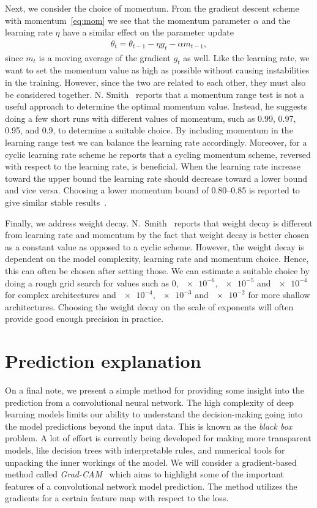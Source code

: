 Next, we consider the choice of momentum. From the gradient descent scheme with
momentum~\cref{eq:mom} we see that the momentum parameter $\alpha$ and the
learning rate $\eta$ have a similar effect on the parameter update
\begin{align*}
  \theta_t = \theta_{t-1} - \eta g_t - \alpha m_{t-1},
\end{align*}
since $m_t$ is a moving average of the gradient $g_t$ as well. Like the learning
rate, we want to set the momentum value as high as possible without causing
instabilities in the training. However, since the two are related to each other,
they must also be considered together. N. Smith~\cite{smith2018disciplined} reports that a momentum range test is not a useful approach to determine the
optimal momentum value. Instead, he suggests doing a few short runs with different values of momentum,
such as 0.99, 0.97, 0.95, and 0.9, to determine a suitable choice. By including
momentum in the learning range test we can balance the learning rate accordingly. Moreover, for a cyclic learning rate scheme he reports that a cycling momentum scheme, reversed with respect to the learning rate, is beneficial. When the
learning rate increase toward the upper bound the learning rate should
decrease toward a lower bound and vice versa. Choosing a lower momentum bound of
0.80--0.85 is reported to give similar stable results~\cite{smith2018disciplined}. 

Finally, we address weight decay. N.\ Smith~\cite{smith2018disciplined} reports that weight decay is different from learning rate and momentum by the fact that weight decay is better chosen as a constant value as opposed to a cyclic scheme. However, the weight decay is dependent on the model complexity, learning rate and momentum choice. Hence, this can often be chosen after setting those. We can estimate a suitable choice by doing a rough grid search for values such as 0, $\num{e-6}$, $\num{e-5}$ and $\num{e-4}$ for complex architectures and $\num{e-4}$, $\num{e-3}$ and $\num{e-2}$ for more shallow architectures. Choosing the weight decay on the scale of exponents will often provide good enough precision in practice. 


\section{Prediction explanation}\label{sec:explanation}
On a final note, we present a simple method for providing some insight into the prediction from a convolutional neural network. The high complexity of deep learning models limits our ability to understand the decision-making going into the model predictions beyond the input data. This is known as the \textit{black box} problem. A lot of effort is currently being developed for making more transparent models, like decision trees with interpretable rules, and numerical tools for unpacking the inner workings of the model. We will consider a gradient-based method called \textit{Grad-CAM}~\cite{Selvaraju_2019} which aims to highlight some of the important features of a convolutional network model prediction. The method utilizes the gradients for a certain feature map with respect to the loss. 


